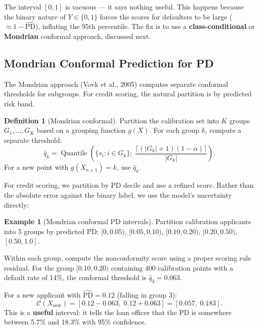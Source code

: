 \documentclass[11pt, a4paper]{article}
\theoremstyle{definition}
\newtheorem{definition}{Definition}[section]
\newtheorem{example}{Example}[section]
\theoremstyle{plain}
\theoremstyle{remark}
\newcommand{\Ccal}{\mathcal{C}}
\DeclareMathOperator{\Quantile}{Quantile}
\begin{document}
\begin{warningbox}
The interval $[0, 1]$ is vacuous --- it says nothing useful.
This happens because the binary nature of $Y \in \{0, 1\}$ forces the scores
for defaulters to be large ($\approx 1 - \widehat{\mathrm{PD}}$), inflating the
95th percentile.
The fix is to use a \textbf{class-conditional} or \textbf{Mondrian} conformal
approach, discussed next.
\end{warningbox}

\subsection{Mondrian Conformal Prediction for PD}

The Mondrian approach (Vovk et al., 2005) computes separate conformal thresholds
for subgroups.
For credit scoring, the natural partition is by predicted risk band.

\begin{definition}[Mondrian conformal]\label{def:mondrian}
Partition the calibration set into $K$ groups $G_1, \ldots, G_K$ based on a
grouping function $g(X)$.
For each group $k$, compute a separate threshold:
\begin{equation}
    \hat{q}_k = \Quantile\!\left(\{s_i : i \in G_k\};\;
    \frac{\lceil (|G_k|+1)(1-\alpha) \rceil}{|G_k|}\right).
\end{equation}
For a new point with $g(X_{n+1}) = k$, use $\hat{q}_k$.
\end{definition}

For credit scoring, we partition by PD decile and use a refined score.
Rather than the absolute error against the binary label, we use the model's
uncertainty directly:

\begin{example}[Mondrian conformal PD intervals]\label{ex:mondrian-pd}
Partition calibration applicants into 5 groups by predicted PD:
$[0, 0.05)$, $[0.05, 0.10)$, $[0.10, 0.20)$, $[0.20, 0.50)$, $[0.50, 1.0]$.

Within each group, compute the nonconformity score using a proper scoring rule
residual.
For the group $[0.10, 0.20)$ containing 400 calibration points with a default
rate of 14\%, the conformal threshold is $\hat{q}_3 = 0.063$.

For a new applicant with $\widehat{\mathrm{PD}} = 0.12$ (falling in group 3):
\[
    \Ccal(X_{\mathrm{new}}) = [0.12 - 0.063,\; 0.12 + 0.063] = [0.057,\; 0.183].
\]
This is a \textbf{useful} interval: it tells the loan officer that the PD is
somewhere between 5.7\% and 18.3\% with 95\% confidence.
\end{example}
\end{document}

